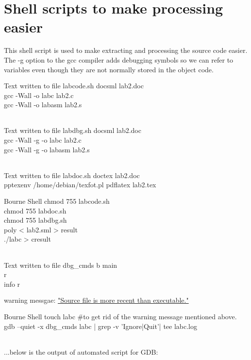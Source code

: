 \documentclass{article}
\begin{document}
\clearpage
\section*{Shell scripts to make processing easier}
This shell script is used to make extracting and processing the source code easier. The -g option to the gcc compiler adds debugging symbols so we can refer to variables even though they are not normally stored in the object code. 

\begin{GFT}{Text written to file labcode.sh}
\+docsml lab2.doc\\
\+gcc -Wall -o labc lab2.c\\
\+gcc -Wall -o labasm lab2.s\\
\+\\
\end{GFT}
\begin{GFT}{Text written to file labdbg.sh}
\+docsml lab2.doc\\
\+gcc -Wall -g -o labc lab2.c\\
\+gcc -Wall -g -o labasm lab2.s\\
\+\\
\end{GFT}
\begin{GFT}{Text written to file labdoc.sh}
\+doctex lab2.doc\\
\+pptexenv /home/debian/texfot.pl pdflatex lab2.tex\\
\end{GFT}
\begin{GFT}{Bourne Shell}
\+chmod 755 labcode.sh \\
\+chmod 755 labdoc.sh\\
\+chmod 755 labdbg.sh\\
\+poly < lab2.sml > result\\
\+./labc > cresult\\
\+\\
\end{GFT}
\begin{GFT}{Text written to file dbg\_cmds}
\+b main\\
\+r\\
\+info r\\
\end{GFT}
warning messgae: \href{http://web.stanford.edu/class/cs107/guide_gdb.html}{"Source file is more recent than executable."}
\begin{GFT}{Bourne Shell}
\+touch labc \#to get rid of the warning message mentioned above.\\
\+gdb --quiet -x dbg\_cmds labc | grep -v 'Ignore\Backslash{}|Quit'| tee labc.log\\
\+\\
\end{GFT}
\clearpage
...below is the output of automated script for GDB:

\end{document}
